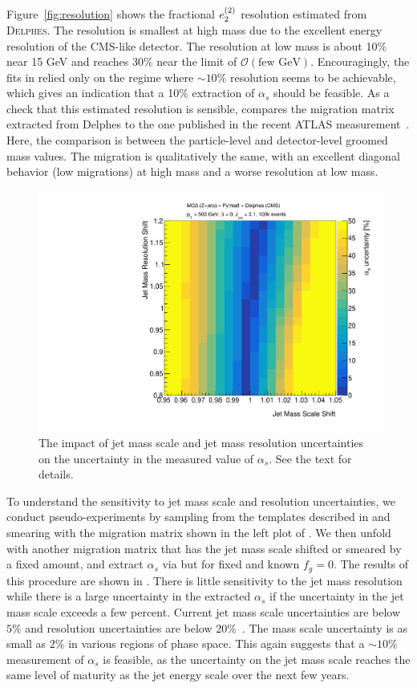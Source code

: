 Figure~\ref{fig:resolution} shows the fractional $e_{2}^{(2)}$ resolution estimated from \textsc{Delphes}.
%
The resolution is smallest at high mass due to the excellent energy resolution of the CMS-like detector.
%
The resolution at low mass is about 10\% near 15 GeV and reaches 30\% near the limit of $\mathcal{O}(\text{few GeV})$.
%
Encouragingly, the fits in  relied only on the regime where $\sim 10\%$ resolution seems to be achievable, which gives an indication that a 10\% extraction of $\alpha_s$ should be feasible.
%
As a check that this estimated resolution is sensible,  compares the migration matrix extracted from Delphes to the one published in the recent ATLAS measurement~\cite{Aaboud:2017qwh}.
%
Here, the comparison is between the particle-level and detector-level groomed mass values. 
%
The migration is qualitatively the same, with an excellent diagonal behavior (low migrations) at high mass and a worse resolution at low mass.






\begin{figure}[t]
\begin{center}
\includegraphics[width = 0.49\columnwidth]{figures/experimentaldemo/resolution_scan.pdf}
\end{center}
\caption{The impact of jet mass scale and jet mass resolution uncertainties on the uncertainty in the measured value of $\alpha_s$.  See the text for details.}
\label{fig:expfit}
\end{figure}

To understand the sensitivity to jet mass scale and resolution uncertainties, we conduct pseudo-experiments by sampling from the templates described in  and smearing with the migration matrix shown in the left plot of .
%
We then unfold with another migration matrix that has the jet mass scale shifted or smeared by a fixed amount, and extract $\alpha_s$ via  but for fixed and known $f_g=0$.
%
The results of this procedure are shown in .
%
There is little sensitivity to the jet mass resolution while there is a large uncertainty in the extracted $\alpha_s$ if the uncertainty in the jet mass scale exceeds a few percent.
%
Current jet mass scale uncertainties are below $5\%$ and resolution uncertainties are below 20\%~\cite{ATLAS-CONF-2017-063,CMS-PAS-JME-16-003}.
%
The mass scale uncertainty is as small as $2\%$ in various regions of phase space.
%
This again suggests that a $\sim 10\%$ measurement of $\alpha_s$ is feasible, as the uncertainty on the jet mass scale reaches the same level of maturity as the jet energy scale over the next few years.



